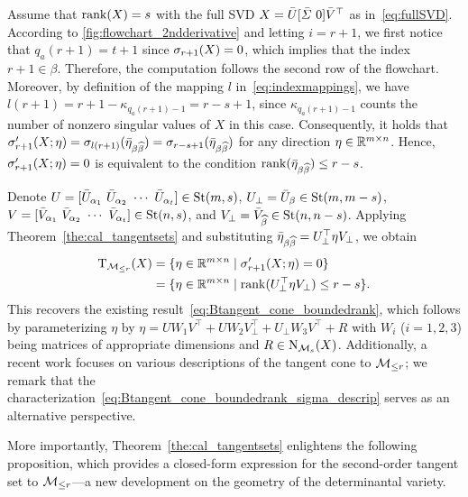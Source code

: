 Assume that $\operatorname{rank}(X)=s$ with the full SVD $X=\bU[\bar{\varSigma}\ 0]\bV^\top$ as in~\eqref{eq:fullSVD}. According to \myfig\ref{fig:flowchart_2ndderivative} and letting $i=r+1$, we first notice that $q_a(r+1)=t+1$ since $\sigma_{r+1}(X)=0$, which implies that the index $r+1\in\beta$. Therefore, the computation follows the second row of the flowchart. Moreover, by definition of the mapping $l$ in~\eqref{eq:indexmappings}, we have $l(r+1)=r+1-\kappa_{q_a(r+1)-1}=r-s+1$, since $\kappa_{q_a(r+1)-1}$ counts the number of nonzero singular values of $X$ in this case. Consequently, it holds that $\sigma_{r+1}^\prime(X;\eta)=\sigma_{l(r+1)}(\bar{\eta}_{\beta\widehat{\beta}})=\sigma_{r-s+1}(\bar{\eta}_{\beta\widehat{\beta}})$ for any direction $\eta\in\mathbb{R}^{m\times n}$. Hence, $\sigma_{r+1}^\prime(X;\eta)=0$ is equivalent to the condition $\operatorname{rank}(\bar{\eta}_{\beta\widehat{\beta}})\le r-s$.

Denote $U=[\bU_{\alpha_1}\ \bU_{\alpha_2}\ \cdots\ \bU_{\alpha_t}]\in\stiefel(m,s)$, $U_\bot=\bar{U}_{\beta}\in\mathrm{St}(m,m-s)$, $V=[\bV_{\alpha_1}\ \bV_{\alpha_2}\ \cdots\ \bV_{\alpha_t}]\in\stiefel(n,s)$, and $V_\bot=\bar{V}_{\widehat{\beta}}\in\mathrm{St}(n,n-s)$.  Applying Theorem~\ref{the:cal_tangentsets} and substituting $\bar{\eta}_{\beta\widehat{\beta}}=U_\bot^\top\eta V_\bot$, we obtain
\begin{align}
    \mathrm{T}_{\mathcal{M}_{\le r}}(X)&=\{\eta\in\mathbb{R}^{m\times n}\mid\sigma_{r+1}^\prime(X;\eta)=0\}  \label{eq:Btangent_cone_boundedrank_sigma_descrip} 
    \\
    &=\{\eta\in\mathbb{R}^{m\times n}\mid\operatorname{rank}(U_\bot^\top\eta V_\bot)\le r-s\}.   \nonumber
\end{align}
This recovers the existing result~\eqref{eq:Btangent_cone_boundedrank}, which follows by parameterizing $\eta$ by $\eta=UW_1V^\top+UW_2V_\bot^\top+U_\bot W_3V^\top+R$ with $W_i$ ($i=1,2,3$) being matrices of appropriate dimensions and $R\in\mathrm{N}_{\mathcal{M}_{s}}(X)$. Additionally, a recent work \cite{olikier2025fourtangentproof} focuses on various descriptions of the tangent cone to $\mathcal{M}_{\le r}$; we remark that the characterization~\eqref{eq:Btangent_cone_boundedrank_sigma_descrip} serves as an alternative perspective.

More importantly, Theorem~\ref{the:cal_tangentsets} enlightens the following proposition, which provides a closed-form expression for the second-order tangent set to $\mathcal{M}_{\le r}$---a new development on the geometry of the determinantal variety.


